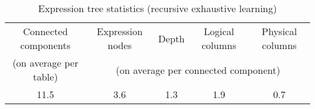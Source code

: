 \begin{table}[h]
\centering
\begin{tabular}{c|cccc}
Connected components   & Expression nodes & Depth & Logical columns & Physical columns \\
(on average per table) & \multicolumn{4}{c}{(on average per connected component)}  \\ \hline
11.5                   & 3.6              & 1.3   & 1.9           & 0.7           
\end{tabular}
\caption{Expression tree statistics (recursive exhaustive learning)}
\label{tab:eval:results:recexh:analysis2}
\end{table}
